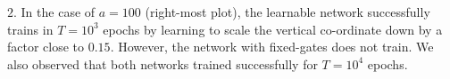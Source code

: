 $2.$ In the case of $a=100$ (right-most plot), the learnable network successfully trains in $T=10^3$ epochs by learning to scale the vertical co-ordinate down by a factor close to $0.15$. However, the network with fixed-gates does not train. We also observed that both networks trained successfully for $T=10^4$ epochs.

